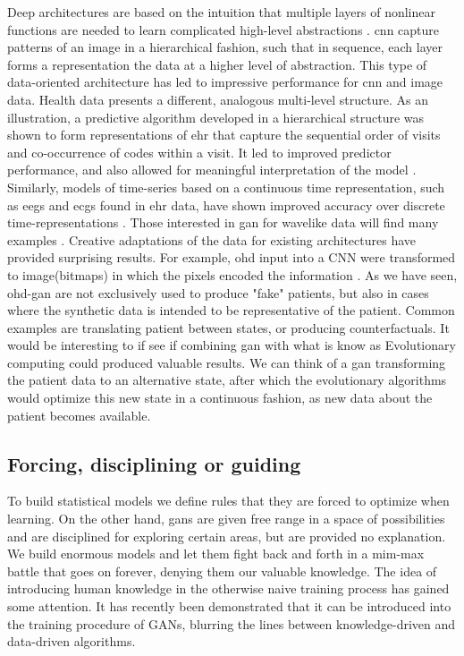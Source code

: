 Deep architectures are based on the intuition that multiple layers of nonlinear functions are needed to learn complicated high-level abstractions \cite{Bengio_2009}. \gls{cnn} capture patterns of an image in a hierarchical fashion, such that in sequence, each layer forms a representation the data at a higher level of abstraction. This type of data-oriented architecture has led to impressive performance for \gls{cnn} and image data. Health data presents a different, analogous multi-level structure. As an illustration, a predictive algorithm developed in a hierarchical structure was shown to form representations of \gls{ehr} that capture the sequential order of visits and co-occurrence of codes within a visit. It led to improved predictor performance, and also allowed for meaningful interpretation of the model \cite{choi2016multi}. Similarly, models of time-series based on a continuous time representation, such as \glspl{eeg} and \glspl{ecg} found in \gls{ehr} data, have shown improved accuracy over discrete time-representations \cite{rubanova2019latent,de2019gru}. Those interested in \gls{gan} for wavelike data will find many examples \cite{Delaney2019,Golany2019,Ye2019,Wang2019d,Singh2020,Aznan2019,Hartmann2018}.  Creative adaptations of the data for existing architectures have provided surprising results. For example, \gls{ohd} input into a CNN were transformed to image(bitmaps) in which the pixels encoded the information \cite{Fukae2020}.
As we have seen, \gls{ohd-gan} are not exclusively used to produce "fake" patients, but also in cases where the synthetic data is intended to be representative of the patient. Common examples are translating patient between states, or producing counterfactuals. It would be interesting to if see if combining \gls{gan} with what is know as Evolutionary computing could produced valuable results. We can think of a \gls{gan} transforming the patient data to an alternative state, after which the evolutionary algorithms would optimize this new state in a continuous fashion, as new data about the patient becomes available.

%
%
\subsection{Forcing, disciplining or guiding \label{sec:knowledge}}
To build statistical models we define rules that they are forced to optimize when learning. On the other hand, \glspl{gan} are given free range in a space of possibilities and are disciplined for exploring certain areas, but are provided no explanation. We build enormous models and let them fight back and forth in a mim-max battle that goes on forever, denying them our valuable knowledge. The idea of introducing human knowledge in the otherwise naive training process has gained some attention. It has recently been demonstrated that it can be introduced into the training procedure of GANs, blurring the lines between knowledge-driven and data-driven algorithms.\par


